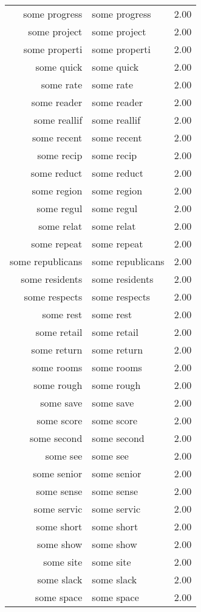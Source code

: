 \begin{table}[ht]
\begin{tabular}{rlr}
  some progress & some progress & 2.00 \\ 
  some project & some project & 2.00 \\ 
  some properti & some properti & 2.00 \\ 
  some quick & some quick & 2.00 \\ 
  some rate & some rate & 2.00 \\ 
  some reader & some reader & 2.00 \\ 
  some reallif & some reallif & 2.00 \\ 
  some recent & some recent & 2.00 \\ 
  some recip & some recip & 2.00 \\ 
  some reduct & some reduct & 2.00 \\ 
  some region & some region & 2.00 \\ 
  some regul & some regul & 2.00 \\ 
  some relat & some relat & 2.00 \\ 
  some repeat & some repeat & 2.00 \\ 
  some republicans & some republicans & 2.00 \\ 
  some residents & some residents & 2.00 \\ 
  some respects & some respects & 2.00 \\ 
  some rest & some rest & 2.00 \\ 
  some retail & some retail & 2.00 \\ 
  some return & some return & 2.00 \\ 
  some rooms & some rooms & 2.00 \\ 
  some rough & some rough & 2.00 \\ 
  some save & some save & 2.00 \\ 
  some score & some score & 2.00 \\ 
  some second & some second & 2.00 \\ 
  some see & some see & 2.00 \\ 
  some senior & some senior & 2.00 \\ 
  some sense & some sense & 2.00 \\ 
  some servic & some servic & 2.00 \\ 
  some short & some short & 2.00 \\ 
  some show & some show & 2.00 \\ 
  some site & some site & 2.00 \\ 
  some slack & some slack & 2.00 \\ 
  some space & some space & 2.00 \\ 

\end{tabular}
\end{table}
